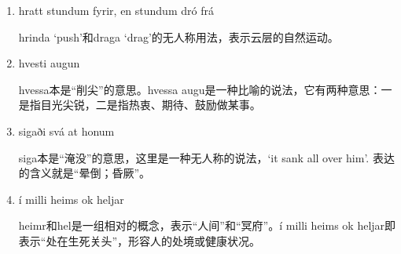 \begin{grammar*}{}
  \begin{enumerate}[leftmargin=*]
    \item hratt stundum fyrir, en stundum dró frá

          hrinda `push'和draga `drag'的无人称用法，表示云层的自然运动。

    \item hvesti augun

          hvessa本是“削尖”的意思。hvessa augu是一种比喻的说法，它有两种意思：一是指目光尖锐，二是指热衷、期待、鼓励做某事。

    \item sigaði svá at honum

          siga本是“淹没”的意思，这里是一种无人称的说法，`it sank all over him'. 表达的含义就是“晕倒；昏厥”。

    \item í milli heims ok heljar

          heimr和hel是一组相对的概念，表示“人间”和“冥府”。í milli heims ok heljar即表示“处在生死关头”，形容人的处境或健康状况。

  \end{enumerate}
\end{grammar*}

